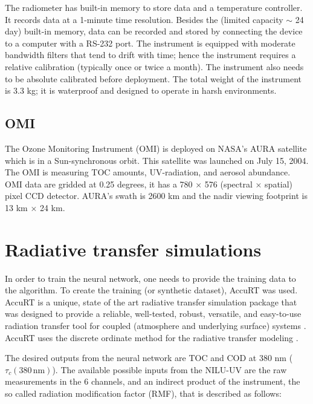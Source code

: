 \documentclass{optica-article}
\begin{document}
The radiometer has built-in memory to store data and a temperature controller. 
It records data at a 1-minute time resolution. 
Besides the (limited capacity $\sim$ 24 day) built-in memory, data can be recorded and stored by connecting the device to a computer with a RS-232 port. 
The instrument is equipped with moderate bandwidth filters that tend to drift with time; hence the instrument requires a relative calibration (typically once or twice a month). 
The instrument also needs to be absolute calibrated before deployment. 
The total weight of the instrument is 3.3 kg; it is waterproof and designed to operate in harsh environments.

\subsection{OMI}
\label{sec-omi}

The Ozone Monitoring Instrument (OMI) is deployed on NASA’s AURA satellite which is in a Sun-synchronous orbit. 
This satellite was launched on July 15, 2004. 
The OMI is measuring TOC amounts, UV-radiation, and aerosol abundance. 
OMI data are gridded at 0.25 degrees, it has a 780 × 576 (spectral × spatial) pixel CCD detector. 
AURA’s swath is 2600 km and the nadir viewing footprint is 13 km × 24 km.


\section{Radiative transfer simulations}	
\label{sec-simulations}

In order to train the neural network, one needs to provide the training data to the algorithm. 
To create the training (or synthetic dataset), AccuRT was used. 
AccuRT is a unique, state of the art radiative transfer simulation package that was designed to provide a reliable, well-tested, robust, versatile, and easy-to-use radiation transfer tool for coupled (atmosphere and underlying surface) systems {\cite{Knut:2018}}. 
AccuRT uses the discrete ordinate method for the radiative transfer modeling \cite{Knut:1988}.

The desired outputs from the neural network are TOC and COD at 380 nm ($\tau_c{\scriptstyle(380 \, \text{nm})}$).  
The available possible inputs from the NILU-UV are the raw measurements in the 6 channels, and an indirect product of the instrument, the so called radiation modification factor (RMF), that is described as follows:
\end{document}
